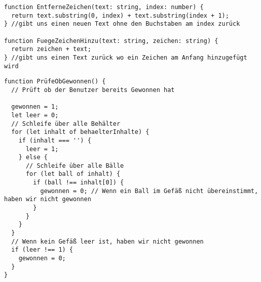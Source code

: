 \documentclass{article}
\begin{document}
    \begin{tcolorbox}[colback=gray!30, colframe=white]
        \begin{verbatim}
function EntferneZeichen(text: string, index: number) {
  return text.substring(0, index) + text.substring(index + 1);
} //gibt uns einen neuen Text ohne den Buchstaben am index zurück

function FuegeZeichenHinzu(text: string, zeichen: string) {
  return zeichen + text;
} //gibt uns einen Text zurück wo ein Zeichen am Anfang hinzugefügt wird
\end{verbatim}
    \end{tcolorbox}
\newpage
{}
    \begin{tcolorbox}[colback=gray!30, colframe=white]
        \begin{verbatim}
function PrüfeObGewonnen() {
  // Prüft ob der Benutzer bereits Gewonnen hat

  gewonnen = 1;
  let leer = 0;
  // Schleife über alle Behälter
  for (let inhalt of behaelterInhalte) {
    if (inhalt === '') {
      leer = 1;
    } else {
      // Schleife über alle Bälle
      for (let ball of inhalt) {
        if (ball !== inhalt[0]) {
          gewonnen = 0; // Wenn ein Ball im Gefäß nicht übereinstimmt, haben wir nicht gewonnen
        }
      }
    }
  }
  // Wenn kein Gefäß leer ist, haben wir nicht gewonnen
  if (leer !== 1) {
    gewonnen = 0;
  }
}
\end{verbatim}
    \end{tcolorbox}
\newpage
\end{document}

